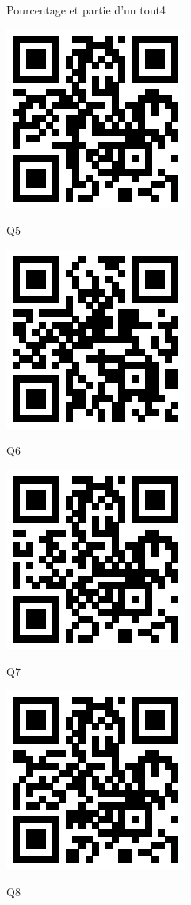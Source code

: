 \documentclass[a4paper,11pt]{report}
\begin{document}
\begin{qmoodle}{Pourcentage et partie d'un tout}{4}
{\begin{center}
		\includegraphics[scale=1]{img/no3fractions/ptpq/ptpq_4}
	\end{center}
	\begin{center}
		Q5

		\includegraphics[scale=1]{img/no3fractions/ptpq/ptpq_5}
	\end{center}
	\begin{center}
		Q6

		\includegraphics[scale=1]{img/no3fractions/ptpq/ptpq_6}
	\end{center}
	\begin{center}
		Q7

		\includegraphics[scale=1]{img/no3fractions/ptpq/ptpq_7}
	\end{center}
	\begin{center}
		Q8


\end{center}}
\end{qmoodle}
\end{document}
